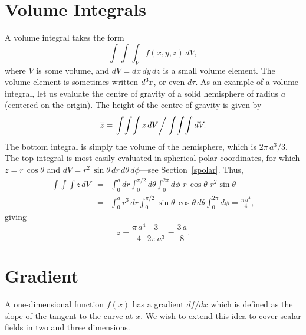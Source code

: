 \section{Volume Integrals}
A volume integral takes the form
\begin{equation}
\int\!\int\!\int_V f(x,y,z)\,dV,
\end{equation}
where $V$ is some volume, and $dV = dx \,dy \,dz$ is a small volume element. The
volume element is sometimes written $d^3{\bf r}$, or even $d\tau$. As an example
of a volume integral, let us evaluate the centre of gravity of a solid hemisphere
of radius $a$ (centered on the origin). 
The height of the centre of gravity is given by
\begin{equation}
\overline{z} = \left. \int\!\int\!\int z\,dV\right/ \int\!\int\!\int dV.
\end{equation}
The bottom integral is simply the volume of the hemisphere, which is $2\pi \,a^3/3$.
The top integral is most easily evaluated in spherical polar coordinates, for which
$z= r\,\cos\theta$ and $dV = r^2\,\sin\theta\,dr\,d\theta\,d\phi$---see Section~\ref{spolar}. Thus,
\begin{eqnarray}
\int\int
\int z\,dV &= &\int_0^a dr\int_0^{\pi/2} d\theta \int_0^{2\pi} d\phi\,\,r\,\cos\theta\,
\,
r^2 \sin\theta\nonumber\\[0.5ex]
&=& \int_0^a r^3\,dr \int_0^{\pi/2} \sin\theta \,\cos\theta\,d\theta \int_0^{2\pi}
d\phi = \frac{\pi \,a^4}{4},
\end{eqnarray}
giving
\begin{equation}
\overline{z} = \frac{ \pi \,a^4}{4}\frac{3}{2\pi \,a^3}= \frac{3\,a}{8}.
\end{equation}

\section{Gradient}
A one-dimensional function $f(x)$ has a  gradient $df/dx$ which is
defined as the slope of the tangent to the curve at $x$. 
We wish to extend this idea to cover scalar fields in two and three dimensions. 

